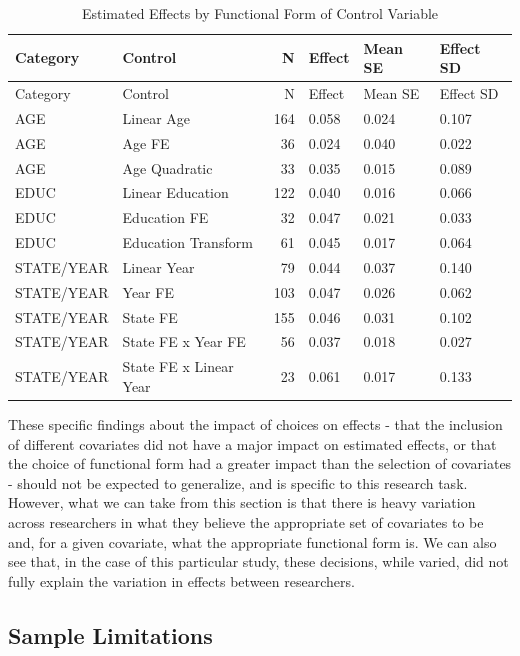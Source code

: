 \documentclass[
  letterpaper,
  DIV=11,
  numbers=noendperiod]{scrartcl}
\begin{document}
\begin{longtable}[]{@{}llrlll@{}}
\caption{Estimated Effects by Functional Form of Control Variable
\label{tab-effects-by-functional-form}}\tabularnewline
\toprule\noalign{}
Category & Control & N & Effect & Mean SE & Effect SD \\
\midrule\noalign{}
\endfirsthead
\toprule\noalign{}
Category & Control & N & Effect & Mean SE & Effect SD \\
\midrule\noalign{}
\endhead
\bottomrule\noalign{}
\endlastfoot
AGE & Linear Age & 164 & 0.058 & 0.024 & 0.107 \\
AGE & Age FE & 36 & 0.024 & 0.040 & 0.022 \\
AGE & Age Quadratic & 33 & 0.035 & 0.015 & 0.089 \\
EDUC & Linear Education & 122 & 0.040 & 0.016 & 0.066 \\
EDUC & Education FE & 32 & 0.047 & 0.021 & 0.033 \\
EDUC & Education Transform & 61 & 0.045 & 0.017 & 0.064 \\
STATE/YEAR & Linear Year & 79 & 0.044 & 0.037 & 0.140 \\
STATE/YEAR & Year FE & 103 & 0.047 & 0.026 & 0.062 \\
STATE/YEAR & State FE & 155 & 0.046 & 0.031 & 0.102 \\
STATE/YEAR & State FE x Year FE & 56 & 0.037 & 0.018 & 0.027 \\
STATE/YEAR & State FE x Linear Year & 23 & 0.061 & 0.017 & 0.133 \\
\end{longtable}

These specific findings about the impact of choices on effects - that
the inclusion of different covariates did not have a major impact on
estimated effects, or that the choice of functional form had a greater
impact than the selection of covariates - should not be expected to
generalize, and is specific to this research task. However, what we can
take from this section is that there is heavy variation across
researchers in what they believe the appropriate set of covariates to be
and, for a given covariate, what the appropriate functional form is. We
can also see that, in the case of this particular study, these
decisions, while varied, did not fully explain the variation in effects
between researchers.

\hypertarget{sec-sample-limitations}{%
\subsection{Sample Limitations}\label{sec-sample-limitations}}
\end{document}
